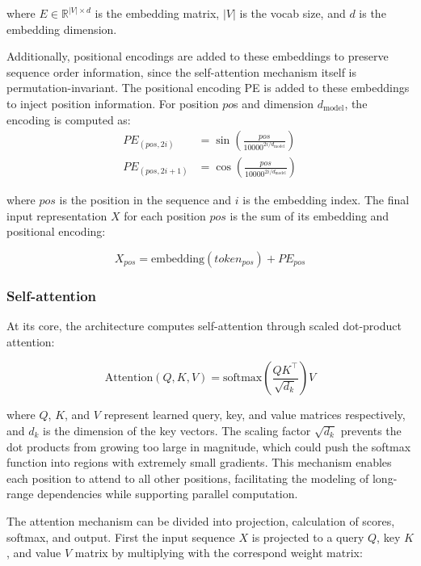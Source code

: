 where $E \in \mathbb{R}^{|V|\times d} $ is the embedding matrix, $|V|$ is the vocab size, and $ d $ is the embedding dimension.

Additionally, positional encodings are added to these embeddings to preserve sequence order information, since the self-attention mechanism itself is permutation-invariant. The positional encoding PE is added to these embeddings to inject position information. For position $po$s and dimension $d_{\text{model}}$, the encoding is computed as:
\begin{align}
PE_{(pos,2i)} &= \sin\left(\frac{pos}{10000^{2i/d_{\text{model}}}}\right) \\
PE_{(pos,2i+1)} &= \cos\left(\frac{pos}{10000^{2i/d_{\text{model}}}}\right)
\end{align}

where $pos$ is the position in the sequence and $i$ is the embedding index. The final input representation $X$ for each position $pos$ is the sum of its embedding and positional encoding:

\begin{equation}
X_{pos} = \text{embedding}(token_{pos}) + PE_{pos}
\end{equation}

\subsubsection{Self-attention}
At its core, the architecture computes self-attention through scaled dot-product attention:

\begin{equation}
\text{Attention}(Q, K, V) = \text{softmax}\left(\frac{QK^\top}{\sqrt{d_k}}\right)V \label{eq:attention}
\end{equation}

where $Q$, $K$, and $V$ represent learned query, key, and value matrices respectively, and $d_k$ is the dimension of the key vectors. The scaling factor $\sqrt{d_k}$ prevents the dot products from growing too large in magnitude, which could push the softmax function into regions with extremely small gradients. This mechanism enables each position to attend to all other positions, facilitating the modeling of long-range dependencies while supporting parallel computation.

The attention mechanism can be divided into projection, calculation of scores, softmax, and output. First the input sequence $X$ is projected to a query $Q$, key $K$, and value $V$ matrix by multiplying with the correspond weight matrix:

